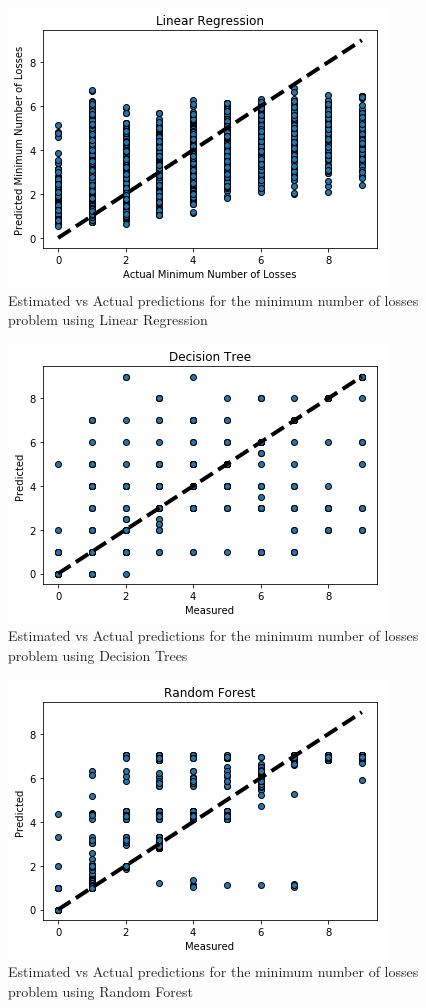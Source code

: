 \documentclass{article}
\begin{document}
	\begin{figure}
		\centering
		\includegraphics[width=0.7\linewidth]{graphs/LR/est-act-predict-LR-mnl}
		\caption{Estimated vs Actual predictions for the minimum number of losses problem using Linear Regression}
		\label{fig:est-act-predict-mnl}
	\end{figure}
	\begin{figure}
		\centering
		\includegraphics[width=0.7\linewidth]{graphs/DT/est-act-predict-DT-mnl}
		\caption{Estimated vs Actual predictions for the minimum number of losses problem using Decision Trees}
		\label{fig:est-act-predict-dt}
	\end{figure}
	\begin{figure}
		\centering
		\includegraphics[width=0.7\linewidth]{graphs/RF/est-act-predict-RF-mnl}
		\caption{Estimated vs Actual predictions for the minimum number of losses problem using Random Forest}
		\label{fig:est-act-predict-rf}
	\end{figure}
\end{document}
